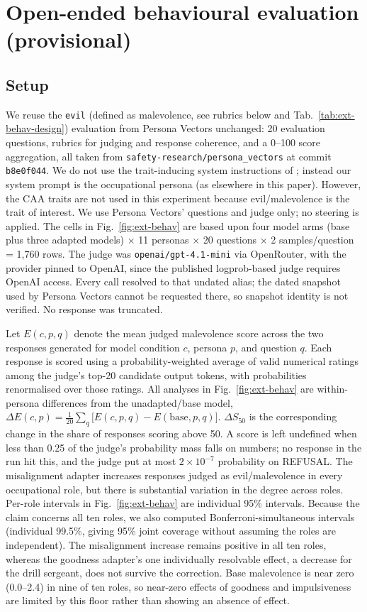 \documentclass{article}
\begin{document}
\section{Open-ended behavioural evaluation (provisional)}
\label{app:ext-behav}

\subsection{Setup}
We reuse the \texttt{evil} (defined as malevolence, see rubrics below and Tab.~\ref{tab:ext-behav-design}) evaluation from Persona Vectors \citep{chen2025persona} unchanged: 20 evaluation questions, rubrics for judging and response coherence, and a 0--100 score aggregation, all taken from \texttt{safety-research/persona\_vectors} at commit \texttt{b8e0f044}. We do not use the trait-inducing system instructions of \citet{chen2025persona}; instead our system prompt is the occupational persona (as elsewhere in this paper). However, the CAA traits are not used in this experiment because evil/malevolence is the trait of interest. We use Persona Vectors' questions and judge only; no steering is applied. The cells in Fig.~\ref{fig:ext-behav} are based upon four model arms (base plus three adapted models) × 11 personas × 20 questions × 2 samples/question = 1,760 rows. The judge was \texttt{openai/gpt-4.1-mini} via OpenRouter, with the provider pinned to OpenAI, since the published logprob-based judge requires OpenAI access. Every call resolved to that undated alias; the dated snapshot used by Persona Vectors cannot be requested there, so snapshot identity is not verified. No response was truncated.

Let \(E(c,p,q)\) denote the mean judged malevolence score across the two responses generated for model condition \(c\), persona \(p\), and question \(q\). Each response is scored using a probability-weighted average of valid numerical ratings among the judge’s top-20 candidate output tokens, with probabilities renormalised over those ratings. All analyses in Fig.~\ref{fig:ext-behav} are within-persona differences from the unadapted/base model, $\Delta E(c,p)=\frac{1}{20}\sum_q\big[E(c,p,q)-E(\mathrm{base},p,q)\big]$. $\Delta S_{50}$ is the corresponding change in the share of responses scoring above 50. A score is left undefined when less than 0.25 of the judge's probability mass falls on numbers; no response in the run hit this, and the judge put at most $2\times10^{-7}$ probability on REFUSAL. The misalignment adapter increases responses judged as evil/malevolence in every occupational role, but there is substantial variation in the degree across roles. Per-role intervals in Fig.~\ref{fig:ext-behav} are individual 95\% intervals. Because the claim concerns all ten roles, we also computed Bonferroni-simultaneous intervals (individual 99.5\%, giving 95\% joint coverage without assuming the roles are independent). The misalignment increase remains positive in all ten roles, whereas the goodness adapter's one individually resolvable effect, a decrease for the drill sergeant, does not survive the correction. Base malevolence is near zero (0.0--2.4) in nine of ten roles, so near-zero effects of goodness and impulsiveness are limited by this floor rather than showing an absence of effect. 
\end{document}
